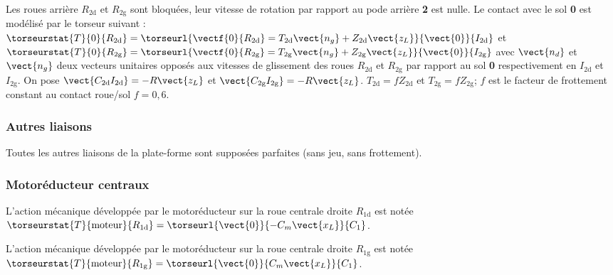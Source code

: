 \begin{multicols}{2}
Les roues arrière $R_{\text{2d}}$ et $R_{\text{2g}}$ sont bloquées, leur vitesse de rotation par rapport au pode arrière \textbf{2} est nulle. Le
contact avec le sol \textbf{0} est modélisé par le torseur suivant :
$\torseurstat{T}{0}{R_{\text{2d}}}=\torseurl{\vectf{0}{R_{\text{2d}}} =T_{\text{2d}}\vect{n_g}+Z_{\text{2d}}\vect{z_L} }{\vect{0}}{I_{\text{2d}}}$ et
$\torseurstat{T}{0}{R_{\text{2g}}}=\torseurl{\vectf{0}{R_{\text{2g}}} =T_{\text{2g}}\vect{n_g}+Z_{\text{2g}}\vect{z_L} }{\vect{0}}{I_{\text{2g}}}$  avec 
$\vect{n_d}$ et $\vect{n_g}$
deux vecteurs unitaires opposés aux vitesses de glissement des roues $R_{\text{2d}}$ et $R_{\text{2g}}$ par rapport au sol 
\textbf{0} respectivement en $I_{\text{2d}}$ et $I_{\text{2g}}$.
On pose $\vect{C_{\text{2d}}I_{\text{2d}}}=-R\vect{z_L}$
et $\vect{C_{\text{2g}}I_{\text{2g}}}=-R\vect{z_L}$.
$T_{\text{2d}}=fZ_{\text{2d}}$ et $T_{\text{2g}}=fZ_{\text{2g}}$; $f$ est le facteur de frottement constant au contact roue/sol $f=0,6$.

\subsubsection*{Autres liaisons}

Toutes les autres liaisons de la plate-forme sont supposées parfaites (sans jeu, sans frottement).

\subsubsection*{Motoréducteur centraux}


L’action mécanique développée par le motoréducteur sur la roue centrale droite $R_{\text{1d}}$ est notée
$\torseurstat{T}{\text{moteur}}{R_{\text{\text{1d}}}}
=\torseurl{\vect{0}}{-C_m\vect{x_L}}{C_1}$.

L’action mécanique développée par le motoréducteur sur la roue centrale droite $R_{\text{1g}}$ est notée
$\torseurstat{T}{\text{moteur}}{R_{\text{\text{1g}}}}
=\torseurl{\vect{0}}{C_m\vect{x_L}}{C_1}$.


\fi


\ifprof
\begin{corrige}
\end{corrige}
\else
\fi

\ifprof
\else


\end{multicols}
